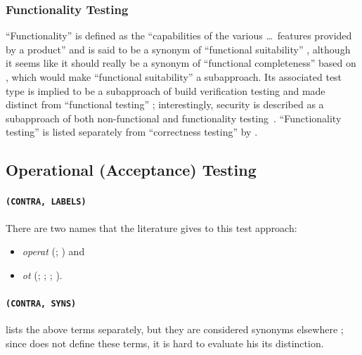 \subsubsection{Functionality Testing}
``Functionality'' is defined as the
``capabilities of the various \dots\ features provided by a product''
\citep[p.~196]{IEEE2017} and is said to be a synonym of
``functional suitability'' \citepISTQB{}, although it seems
like it should really be a synonym of ``functional completeness'' based on
\citep{ISO_IEC2023a}, which would make ``functional suitability'' a
subapproach. Its associated test type
is implied to be a subapproach of build verification testing
\citepISTQB{} and made distinct from ``functional testing''%
\ifnotpaper; interestingly, security is described as a subapproach of both
non-functional and functionality testing\fi\ \citep[Tab.~2]{Gerrard2000a}.
``Functionality testing'' is listed separately from ``correctness testing'' by
\citet[p.~53]{Firesmith2015}.

\ifnotpaper
    \subsection{Operational (Acceptance) Testing}\label{oat-flaw}
    \paragraph{\texttt{(CONTRA, LABELS)}}
    There are two names that the literature gives to this test approach:
    \begin{itemize}
        \item \emph{\acf{operat}} (\citealp[p.~22]{IEEE2022};
              \citealpISTQB{}) and
        \item \emph{\acf{ot}} (\citealp{ISO_IEC2018};
              \citealp[p.~303]{IEEE2017}; \citealp[p.~6\=/9, in the context of
                  software engineering operations]{SWEBOK2024};
              \citealp[pp.~4\=/6, 4\=/9]{SWEBOK2014}).
    \end{itemize}

    \paragraph{\texttt{(CONTRA, SYNS)}}
     \citet[p.~30]{Firesmith2015} lists the above terms separately,
    but they are considered synonyms elsewhere \citep{LambdaTest2024,
        BocchinoAndHamilton1996}; since
    \citeauthor{Firesmith2015} does not define these terms, it is hard to
    evaluate \ifnotpaper his \else its \fi distinction.
\fi


